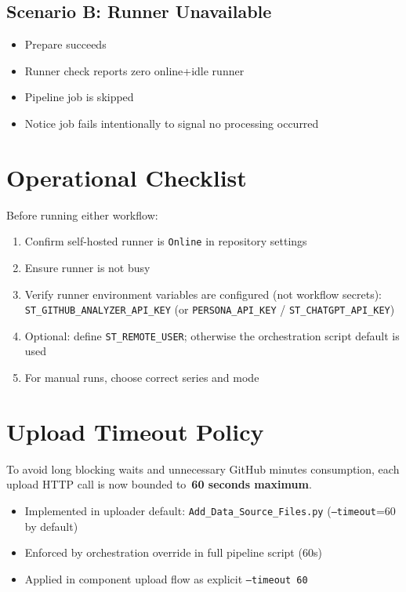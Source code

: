 \documentclass[11pt,a4paper]{article}
\begin{document}
\subsection{Scenario B: Runner Unavailable}
\begin{itemize}
  \item Prepare succeeds
  \item Runner check reports zero online+idle runner
  \item Pipeline job is skipped
  \item Notice job fails intentionally to signal no processing occurred
\end{itemize}

\section{Operational Checklist}
Before running either workflow:
\begin{enumerate}
  \item Confirm self-hosted runner is \texttt{Online} in repository settings
  \item Ensure runner is not busy
  \item Verify runner environment variables are configured (not workflow secrets):\\
  \texttt{ST\_GITHUB\_ANALYZER\_API\_KEY} (or \texttt{PERSONA\_API\_KEY} / \texttt{ST\_CHATGPT\_API\_KEY})
  \item Optional: define \texttt{ST\_REMOTE\_USER}; otherwise the orchestration script default is used
  \item For manual runs, choose correct series and mode
\end{enumerate}

\section{Upload Timeout Policy}
To avoid long blocking waits and unnecessary GitHub minutes consumption, each upload HTTP call is now bounded to\
\textbf{60 seconds maximum}.

\begin{itemize}
  \item Implemented in uploader default: \texttt{Add\_Data\_Source\_Files.py} (\texttt{--timeout}=60 by default)
  \item Enforced by orchestration override in full pipeline script (60s)
  \item Applied in component upload flow as explicit \texttt{--timeout 60}
\end{itemize}
\end{document}
